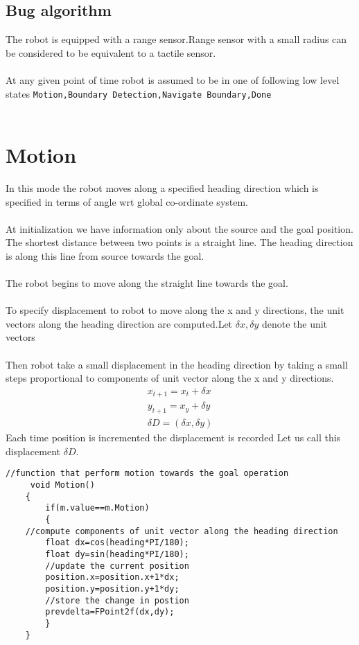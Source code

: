 \documentclass[fontsize=12pt, %
                             paper=a4, %
                             oneside, %
                             captions=tableheading,
                             index=totoc,
                             hyperref]{labbook}
\begin{document}
\subsection{Bug algorithm}
The robot is equipped with a range sensor.Range sensor with a small radius 
can be considered to be equivalent to a tactile sensor.
\\\\
At any given point of time robot is assumed to be in one
of following low level states \texttt{Motion,Boundary Detection,Navigate Boundary,Done}
\\\\
\section{Motion}
In this mode the robot moves along a specified heading direction which is specified
in terms of angle wrt global co-ordinate system.
\\\\
At initialization we have information only about the source and the goal position.
The shortest distance between two points is a straight line.
The heading direction is along this line from source towards the goal.
\\\\
The robot begins  to move along the straight line towards the goal.
\\\\
To specify displacement to robot to move along the x and y directions,
the unit vectors along the heading direction are computed.Let $\delta x,\delta y$
denote the unit vectors
\\\\
Then robot take a small displacement in the heading direction 
by taking a small steps proportional to components of unit vector along
the x and y directions.
\begin{eqnarray}
  x_{t+1} = x_t + \delta{x} \\
  y_{t+1} = x_y + \delta{y} \\
  \delta{D}= (\delta{x},\delta{y})
\end{eqnarray}
Each time position is incremented the displacement is recorded
Let us call this displacement $\delta{D}$.
\begin{verbatim}
//function that perform motion towards the goal operation
     void Motion()
    {
        if(m.value==m.Motion)
        {
	//compute components of unit vector along the heading direction        
        float dx=cos(heading*PI/180); 
        float dy=sin(heading*PI/180);
        //update the current position
        position.x=position.x+1*dx;
        position.y=position.y+1*dy;
        //store the change in postion
        prevdelta=FPoint2f(dx,dy);
        }
    }
\end{verbatim}
\end{document}
